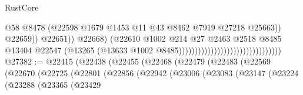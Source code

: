 \begin{lexlean}{RustCore}
\begin{coremodule}
                                                                          @58
                                                                          @8478
                                                                          (@22598
                                                                            @1679
                                                                            @1453
                                                                            @11
                                                                            @43
                                                                            @8462
                                                                            @7919
                                                                            @27218
                                                                            @25663))
                                                                        @22659))
                                                                    @22651))
                                                                @22668)
                                                              (@22610
                                                                @1002
                                                                @214
                                                                @27
                                                                @2463
                                                                @2518
                                                                @8485
                                                                @13404
                                                                @22547
                                                                (@13265
                                                                  (@13633
                                                                    @1002
                                                                    @8485))))))))))))))))))))))))))))))))
@27382 := @22415
    (@22438
      (@22455
        (@22468
          (@22479
            (@22483
              (@22569
                (@22670
                  (@22725
                    (@22801
                      (@22856
                        (@22942
                          (@23006
                            (@23083
                              (@23147
                                (@23224
                                  (@23288
                                    (@23365
                                      (@23429

\end{coremodule}
\end{lexlean}
